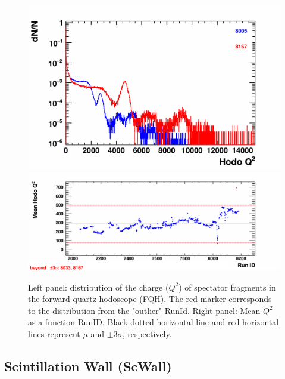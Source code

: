     \begin{figure}[H]
        \begin{center}
            \includegraphics[width=0.35\linewidth]{../pict/QA_RunByRun_24.12/H1/nVtxTr_h2_RunId_hodo_q.png}
            \includegraphics[width=0.60\linewidth]{../pict/QA_RunByRun_24.12/nVtxTr_h2_RunId_hodo_q.png}
            \vspace{-3mm}
            \caption{Left panel: distribution of the charge ($Q^2$) of spectator fragments in the forward quartz hodoscope (FQH). The red marker corresponds to the distribution from the "outlier" RunId. Right panel: Mean $Q^2$ as a function RunID. Black dotted horizontal line and red horizontal lines represent $\mu$ and $\pm3\sigma$, respectively.}
            \label{fig:FQH}
        \end{center}
        \vspace{-5mm}
    \end{figure}


\subsection{Scintillation Wall (ScWall)}

